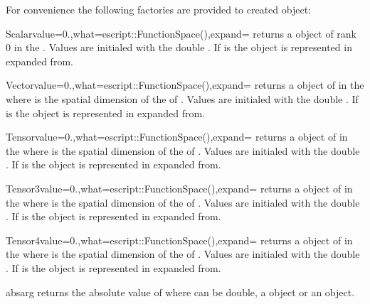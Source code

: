 For convenience the following factories are provided to created \Data object:

\begin{funcdesc}{Scalar}{value=0.,what=escript::FunctionSpace(),expand=\False}
returns a \Data object of rank 0 in the \FunctionSpace {}.
Values are initialed with the double . If  is \True
the \Data object is represented in expanded from.
\end{funcdesc}

\begin{funcdesc}{Vector}{value=0.,what=escript::FunctionSpace(),expand=\False}
returns a \Data object of \Shape {} in the \FunctionSpace {} 
where  is the spatial dimension of the \Domain of .
Values are initialed with the double . If  is \True
the \Data object is represented in expanded from.
\end{funcdesc}

\begin{funcdesc}{Tensor}{value=0.,what=escript::FunctionSpace(),expand=\False}
returns a \Data object of \Shape {} in the \FunctionSpace {} 
where  is the spatial dimension of the \Domain of .
Values are initialed with the double . If  is \True
the \Data object is represented in expanded from.
\end{funcdesc}

\begin{funcdesc}{Tensor3}{value=0.,what=escript::FunctionSpace(),expand=\False}
returns a \Data object of \Shape {} in the \FunctionSpace {} 
where  is the spatial dimension of the \Domain of .
Values are initialed with the double . If  is \True
the \Data object is represented in expanded from.
\end{funcdesc}

\begin{funcdesc}{Tensor4}{value=0.,what=escript::FunctionSpace(),expand=\False}
returns a \Data object of \Shape {} in the \FunctionSpace {} 
where  is the spatial dimension of the \Domain of .
Values are initialed with the double . If  is \True
the \Data object is represented in expanded from.
\end{funcdesc}

\begin{funcdesc}{abs}{arg} 
returns the absolute value of  where 
can be double, a \Data object or an \numarray object.
\end{funcdesc}

